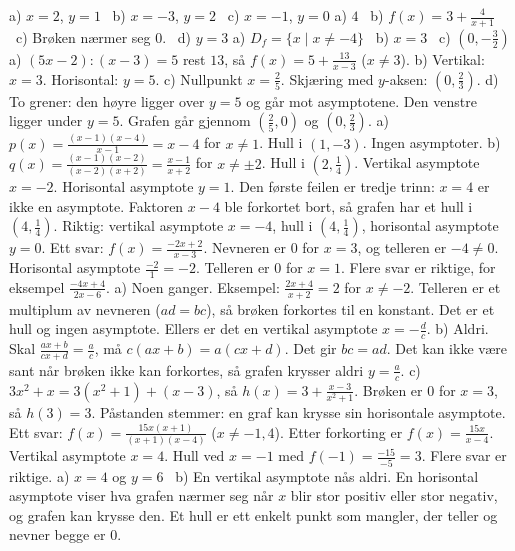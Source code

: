 
 a) $x = 2$, $y = 1$ \ b) $x = -3$, $y = 2$ \ c) $x = -1$, $y = 0$
 a) $4$ \ b) $f(x) = 3 + \frac{4}{x+1}$ \ c) Brøken nærmer seg 0. \ d) $y = 3$
 a) $D_f = \{x \mid x \neq -4\}$ \ b) $x = 3$ \ c) $\left(0, -\frac{3}{2}\right)$
 a) $(5x - 2) : (x - 3) = 5$ rest $13$, så $f(x) = 5 + \frac{13}{x-3}$ ($x \neq 3$).
b) Vertikal: $x = 3$. Horisontal: $y = 5$.
c) Nullpunkt $x = \frac{2}{5}$. Skjæring med $y$-aksen: $\left(0, \frac{2}{3}\right)$.
d) To grener: den høyre ligger over $y = 5$ og går mot asymptotene. Den venstre ligger under $y = 5$. Grafen går gjennom $\left(\frac{2}{5}, 0\right)$ og $\left(0, \frac{2}{3}\right)$.
 a) $p(x) = \frac{(x-1)(x-4)}{x-1} = x - 4$ for $x \neq 1$. Hull i $(1, -3)$. Ingen asymptoter.
b) $q(x) = \frac{(x-1)(x-2)}{(x-2)(x+2)} = \frac{x-1}{x+2}$ for $x \neq \pm 2$. Hull i $\left(2, \frac{1}{4}\right)$. Vertikal asymptote $x = -2$. Horisontal asymptote $y = 1$.
 Den første feilen er tredje trinn: $x = 4$ er ikke en asymptote. Faktoren $x - 4$ ble forkortet bort, så grafen har et hull i $\left(4, \frac{1}{4}\right)$.
Riktig: vertikal asymptote $x = -4$, hull i $\left(4, \frac{1}{4}\right)$, horisontal asymptote $y = 0$.
 Ett svar: $f(x) = \frac{-2x+2}{x-3}$. Nevneren er 0 for $x = 3$, og telleren er $-4 \neq 0$. Horisontal asymptote $\frac{-2}{1} = -2$. Telleren er 0 for $x = 1$.
Flere svar er riktige, for eksempel $\frac{-4x+4}{2x-6}$.
 a) Noen ganger. Eksempel: $\frac{2x+4}{x+2} = 2$ for $x \neq -2$. Telleren er et multiplum av nevneren ($ad = bc$), så brøken forkortes til en konstant. Det er et hull og ingen asymptote. Ellers er det en vertikal asymptote $x = -\frac{d}{c}$.
b) Aldri. Skal $\frac{ax+b}{cx+d} = \frac{a}{c}$, må $c(ax+b) = a(cx+d)$. Det gir $bc = ad$. Det kan ikke være sant når brøken ikke kan forkortes, så grafen krysser aldri $y = \frac{a}{c}$.
c) $3x^2 + x = 3(x^2+1) + (x - 3)$, så $h(x) = 3 + \frac{x-3}{x^2+1}$. Brøken er 0 for $x = 3$, så $h(3) = 3$. Påstanden stemmer: en graf kan krysse sin horisontale asymptote.
 Ett svar: $f(x) = \frac{15x(x+1)}{(x+1)(x-4)}$ ($x \neq -1, 4$). Etter forkorting er $f(x) = \frac{15x}{x-4}$. Vertikal asymptote $x = 4$. Hull ved $x = -1$ med $f(-1) = \frac{-15}{-5} = 3$. Flere svar er riktige.
 a) $x = 4$ og $y = 6$ \ b) En vertikal asymptote nås aldri. En horisontal asymptote viser hva grafen nærmer seg når $x$ blir stor positiv eller stor negativ, og grafen kan krysse den. Et hull er ett enkelt punkt som mangler, der teller og nevner begge er 0.
